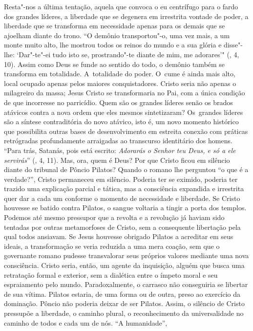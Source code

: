Resta"-nos a última tentação, aquela que convoca o eu centrífugo para o
fardo dos grandes líderes, a liberdade que se degenera em irrestrita
vontade de poder, a liberdade que se transforma em necessidade apenas
para os demais que se ajoelham diante do trono. ``O demônio
transportou"-o, uma vez mais, a um monte muito alto, lhe mostrou todos os
reinos do mundo e a sua glória e disse"-lhe: `Dar"-te"-ei tudo isto se,
prostrando"-te diante de mim, me adorares'" (, 4, 10). Assim como
Deus se funde ao sentido do todo, o demônio também se transforma em
totalidade. A~totalidade do poder. O~cume é ainda mais alto, local
ocupado apenas pelos maiores conquistadores. Cristo seria não apenas o
milagreiro da massa; Jesus Cristo se transformaria no Pai, com a única
condição de que incorresse no parricídio. Quem são os grandes líderes
senão os brados atávicos contra a nova ordem que eles mesmos
sintetizaram? Os~grandes líderes são a síntese contraditória do novo
atávico, isto é, um novo momento histórico que possibilita outras bases
de desenvolvimento em estreita conexão com práticas retrógradas
profundamente arraigadas ao transcurso identitário dos homens. ``Para
trás, Satanás, pois está escrito: \emph{Adorarás o Senhor teu Deus, e só
a ele servirás}'' (, 4, 11). Mas, ora, quem é Deus? Por que Cristo
ficou em silêncio diante do tribunal de Pôncio Pilatos? Quando o romano
lhe perguntou ``o que é a verdade?'', Cristo permaneceu em silêncio.
Poderia ter se eximido, poderia ter trazido uma explicação parcial e
tática, mas a consciência expandida e irrestrita quer dar a cada um
conforme o momento de necessidade e liberdade. Se Cristo houvesse se
batido contra Pilatos, o sangue voltaria a tingir a porta dos templos.
Podemos até mesmo pressupor que a revolta e a revolução já haviam sido
tentadas por outras metamorfoses de Cristo, sem a consequente libertação
pela qual todos ansiavam. Se Jesus houvesse obrigado Pilatos a acreditar
em seus ideais, a transformação se veria reduzida a uma mera coação, sem
que o governante romano pudesse transvalorar seus próprios valores
mediante uma nova consciência. Cristo seria, então, um agente da
inquisição, alguém que busca uma retratação formal e exterior, sem a
dialética entre o ímpeto moral e seu espraiamento pelo mundo.
Paradoxalmente, o carrasco não conseguiria se libertar de sua vítima.
Pilatos estaria, de uma forma ou de outra, preso ao exercício da
dominação. Pôncio não poderia deixar de ser Pilatos. Assim, o silêncio
de Cristo pressupõe a liberdade, o caminho plural, o reconhecimento da
universalidade no caminho de todos e cada um de nós. ``A humanidade'',
